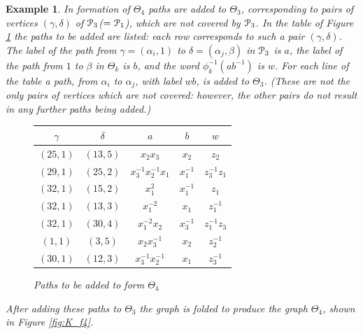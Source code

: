 \documentclass[a4paper,12pt]{article}
\renewcommand{\a}{\alpha }
\renewcommand{\b}{\beta }
\newcommand{\g}{\gamma }
\renewcommand{\d}{\delta }
\newcommand{\T}{\Theta }
\newcommand{\cP}{{\cal{P}}}
\newtheorem{exam}[theorem]{Example}
\newenvironment{example}{\begin{exam} \rm}{\end{exam}}
\numberwithin{equation}{section}
\numberwithin{figure}{section}
\begin{document}
\begin{example}
In formation of $\T_4$ paths are added to $\T_3$,
corresponding to pairs of vertices $(\g,\d)$ of $\cP_3$($=\cP_1$), which
are not covered by $\cP_3$.
In the table of Figure \ref{tab:T4} the paths to be added are listed:
each row corresponds to such a pair $(\g,\d)$. The
label of the path from $\g=(\a_i,1)$ to $\d=(\a_j,\b)$
in $\cP_3$ is $a$,
the label of the path from $1$ to $\b$ in $\T_k$ is $b$, and the word
$\phi_k^{-1}(ab^{-1})$ is $w$. For each line of the table a path,
from $\a_i$ to $\a_j$, with label $wb$, is added to $\T_3$.
(These are not the only pairs of vertices which are not
covered: however, the other pairs do not result in any further paths
being added.)
\begin{figure}
\begin{center}
\renewcommand{\arraystretch}{1.5}
\begin{tabular}{|c|c|c|c|c|}
\hline
$\g$& $\d$ & $a$ & $b$ & $w$\\\hline\hline
$(25,1)$ & $(13,5)$ & $x_2x_3$ & $x_2$ & $z_2 $\\\hline
$(29,1)$ & $(25,2)$ & $x_3^{-1}x_2^{-1}x_1$ & $x_1^{-1}$ & $z_3^{-1}z_1$\\\hline
$(32,1)$ & $(15,2)$ & $x_1^2$ & $ x_1^{-1}$ & $z_1$\\\hline
$(32,1)$ & $(13,3)$ & $x_1^{-2} $ & $x_1 $ & $z_1^{-1} $\\\hline
$(32,1)$ & $(30,4)$ & $x_1^{-2}x_2$ & $x_3^{-1} $ & $z_1^{-1}z_3$\\\hline
$(1,1)$ & $(3,5)$ & $x_2x_3^{-1} $ & $x_2 $ & $z_2^{-1} $\\\hline
$(30,1)$ & $(12,3)$ & $x_3^{-1}x_2^{-1}$ & $x_1 $ & $z_3^{-1} $\\\hline
\end{tabular}
\renewcommand{\arraystretch}{1}
\end{center}
\caption{Paths to be added to form $\T_4$}
\label{tab:T4}
\end{figure}
After adding these paths to $\T_3$ the graph is folded to
produce the graph $\T_4$, shown in Figure \ref{fig:K_f4}.


\end{example}
\end{document}
